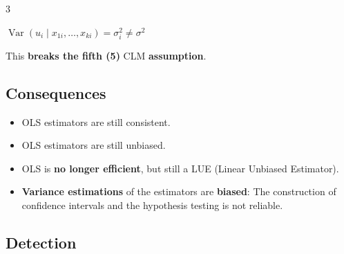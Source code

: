 \documentclass[10pt, a4paper, landscape]{article}
\DeclareMathOperator{\Var}{Var}
\begin{document}
\begin{multicols}{3}
\begin{center}
	\( \Var(u_{i} \mid x_{1i}, \ldots, x_{ki}) = \sigma_{i}^{2} \neq \sigma^{2} \)
\end{center}	

This \textbf{breaks the fifth (5)} CLM \textbf{assumption}.

\subsection*{Consequences}

\begin{itemize}[leftmargin=*]
	\item OLS estimators are still consistent.
	\item OLS estimators are still unbiased.
	\item OLS is \textbf{no longer efficient}, but still a LUE (Linear Unbiased Estimator).
	\item \textbf{Variance estimations} of the estimators are \textbf{biased}: The construction of confidence intervals and the hypothesis testing is not reliable.
\end{itemize}

\subsection*{Detection}


\end{multicols}
\end{document}
